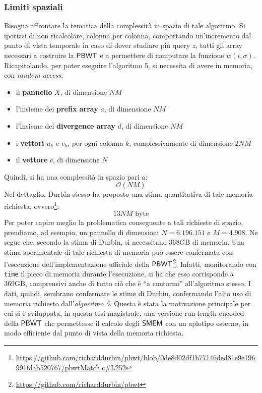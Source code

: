 \subsubsection{Limiti spaziali}
Bisogna affrontare la tematica della complessità in spazio di tale
algoritmo. Si ipotizzi di non ricalcolare, colonna per colonna, comportando
un'incremento dal punto di vista temporale in caso di dover studiare più query
$z$, tutti gli array  
necessari a costruire la $\mbox{\rm {\sf PBWT}}$ e a permettere di computare la funzione
$w(i,\sigma)$.\\
Ricapitolando, per poter eseguire l'algoritmo 5, si necessita di avere in
memoria, con \textit{random access}:
\begin{itemize}
  \item il \textbf{pannello} $X$, di dimensione $NM$
  \item l'insieme dei \textbf{prefix array} $a$, di dimensione $NM$
  \item l'insieme dei \textbf{divergence array} $d$, di dimensione $NM$
  \item i \textbf{vettori} $u_k$ e $v_k$, per ogni colonna $k$, complessivamente
  di dimensione $2NM$ 
  \item il \textbf{vettore} $c$, di dimensione $N$
\end{itemize}
Quindi, si ha una complessità in spazio pari a:
\begin{equation}
  \label{eq:pbwtsize}
  \mathcal{O}(NM)
\end{equation}
Nel dettaglio, Durbin stesso ha proposto una stima quantitativa di tale memoria
richiesta,
ovvero\footnote{\scriptsize{\url{https://github.com/richarddurbin/pbwt/blob/0de8d02df1b77146ded81e9e196991fdab520767/pbwtMatch.c\#L252}}}:
\begin{equation}
  \label{eq:pbwtsize2}
  13NM\mbox{ byte}
\end{equation}
Per poter capire meglio la problematica conseguente a tali richieste di spazio,
prendiamo, ad esempio, un pannello di 
dimensioni $N= 6.196.151$ e $M=4.908$. Ne segue che, secondo la stima
di 
Durbin, si necessitano 368GB di memoria. Una stima
sperimentale di tale richiesta di memoria può essere confermata con l'esecuzione
dell'implementazione ufficiale della
$\mbox{\rm {\sf PBWT}}$\footnote{\url{https://github.com/richarddurbin/pbwt}}. Infatti,
monitorando  
con \texttt{time} il picco di memoria durante l'esecuzione, si ha che esso
corrisponde a 369GB, comprensivi anche di tutto ciò che è ``a
contorno'' all'algoritmo stesso. I dati, quindi, sembrano confermare le stime di
Durbin, confermando l'alto uso di memoria richiesto dall'\textit{algoritmo
  5}. Questa è 
stata la motivazione principale per cui si è sviluppata, in questa tesi
magistrale, una versione run-length encoded della $\mbox{\rm {\sf PBWT}}$ che permettesse il
calcolo degli $\mbox{\rm {\sf SMEM}}$ con un aplotipo esterno, in modo efficiente dal punto di
vista della memoria richiesta.
